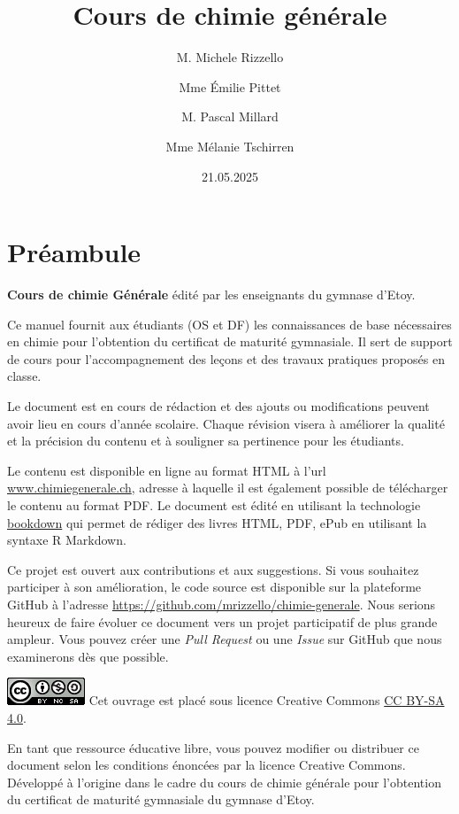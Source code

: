\documentclass[
  11pt,
  a4paper,
  openany]{book}
\title{Cours de chimie générale}
\author{M. Michele Rizzello \and Mme Émilie Pittet \and M. Pascal Millard \and Mme Mélanie Tschirren}
\date{21.05.2025}
\begin{document}
\maketitle

{
\setcounter{tocdepth}{1}
\tableofcontents
}
\chapter*{Préambule}\label{pruxe9ambule}

\textbf{Cours de chimie Générale} édité par les enseignants du gymnase d'Etoy.

Ce manuel fournit aux étudiants (OS et DF) les connaissances de base nécessaires en chimie pour l'obtention du certificat de maturité gymnasiale. Il sert de support de cours pour l'accompagnement des leçons et des travaux pratiques proposés en classe.

Le document est en cours de rédaction et des ajouts ou modifications peuvent avoir lieu en cours d'année scolaire. Chaque révision visera à améliorer la qualité et la précision du contenu et à souligner sa pertinence pour les étudiants.

Le contenu est disponible en ligne au format HTML à l'url \url{www.chimiegenerale.ch}, adresse à laquelle il est également possible de télécharger le contenu au format PDF. Le document est édité en utilisant la technologie \href{https://bookdown.org/}{bookdown} qui permet de rédiger des livres HTML, PDF, ePub en utilisant la syntaxe R Markdown.

Ce projet est ouvert aux contributions et aux suggestions. Si vous souhaitez participer à son amélioration, le code source est disponible sur la plateforme GitHub à l'adresse \url{https://github.com/mrizzello/chimie-generale}. Nous serions heureux de faire évoluer ce document vers un projet participatif de plus grande ampleur. Vous pouvez créer une \emph{Pull Request} ou une \emph{Issue} sur GitHub que nous examinerons dès que possible.


\includegraphics{images/by-nc-sa.png}
Cet ouvrage est placé sous licence Creative Commons \href{https://creativecommons.org/licenses/by-sa/4.0/deed.fr}{CC BY-SA 4.0}.

En tant que ressource éducative libre, vous pouvez modifier ou distribuer ce document selon les conditions énoncées par la licence Creative Commons. Développé à l'origine dans le cadre du cours de chimie générale pour l'obtention du certificat de maturité gymnasiale du gymnase d'Etoy.
\end{document}
